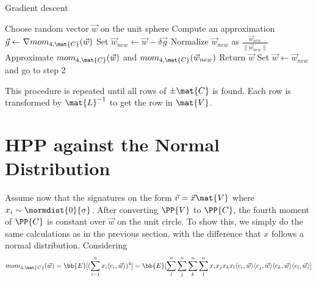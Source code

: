 \begin{algorithm}
\caption{Gradient descent}
\begin{algorithmic}[1]
        \State Choose random vector $\vec{w}$ on the unit sphere
        \State Compute an approximation $\vec{g} \gets \nabla mom_{4, \mat{C}}(\vec{w})$
        \State Set $\vec{w}_{new} \gets \vec{w} - \delta \vec{g} $
        \State Normalize $\vec{w}_{new}$ as $\frac{\vec{w}_{new}}{\lVert \vec{w}_{new} \rVert}$
        \State Approximate $mom_{4, \mat{C}}(\vec{w})$ and $mom_{4, \mat{C}}(\vec{w}_{new})$
            \State Return $\vec{w}$
        \Else{}
        \State Set $\vec{w} \gets \vec{w}_{new}$ and go to step 2
        \EndIf
\end{algorithmic}
\end{algorithm}
This procedure is repeated until all rows of $\pm \mat{C}$ is found. Each row is transformed by $\mat{L}^{-1}$ to get the row in $\mat{V}$.
\section{HPP against the Normal Distribution}

Assume now that the signatures on the form $\vec{v} = \vec{x} \mat{V}$ where $x_i \sim \normdist{0}{\sigma}$. After converting $\PP{V}$ to $\PP{C}$, 
the fourth moment of $\PP{C}$ is constant over $\vec{w}$ on the unit circle.
    To show this, we simply do the same calculations as in the previous section, with the difference that $x$ follows a normal distribution.
    Considering
    \[ mom_{4, \mat{C}}(\vec{w}) = \bb{E}[(\sum_{i=1}^{n} x_i \langle c_i, \vec{w} \rangle ) ^4] = 
        \bb{E}[\sum_{i}^{n} \sum_{j}^{n} \sum_{k}^{n} \sum_{l}^{n} x_i x_j x_k x_l 
        \langle c_i, \vec{w} \rangle \langle c_j, \vec{w} \rangle
    \langle c_k, \vec{w} \rangle \langle c_l, \vec{w} \rangle] \]

